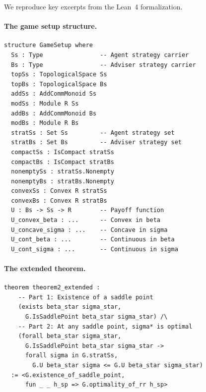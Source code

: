 \documentclass[11pt,a4paper]{article}
\theoremstyle{definition}
\begin{document}
We reproduce key excerpts from the Lean~4 formalization.

\paragraph{The game setup structure.}
\begin{lstlisting}[caption={The \texttt{GameSetup} structure axiomatizing the game (excerpt from \texttt{Theorem2Extension.lean}).},label={lst:gamesetup}]
structure GameSetup where
  Ss : Type                -- Agent strategy carrier
  Bs : Type                -- Adviser strategy carrier
  topSs : TopologicalSpace Ss
  topBs : TopologicalSpace Bs
  addSs : AddCommMonoid Ss
  modSs : Module R Ss
  addBs : AddCommMonoid Bs
  modBs : Module R Bs
  stratSs : Set Ss         -- Agent strategy set
  stratBs : Set Bs         -- Adviser strategy set
  compactSs : IsCompact stratSs
  compactBs : IsCompact stratBs
  nonemptySs : stratSs.Nonempty
  nonemptyBs : stratBs.Nonempty
  convexSs : Convex R stratSs
  convexBs : Convex R stratBs
  U : Bs -> Ss -> R        -- Payoff function
  U_convex_beta : ...      -- Convex in beta
  U_concave_sigma : ...    -- Concave in sigma
  U_cont_beta : ...        -- Continuous in beta
  U_cont_sigma : ...       -- Continuous in sigma
\end{lstlisting}

\paragraph{The extended theorem.}
\begin{lstlisting}[caption={The complete Extended Theorem~2 in Lean~4 (from \texttt{Theorem2Extension.lean}).},label={lst:theorem}]
theorem theorem2_extended :
    -- Part 1: Existence of a saddle point
    (exists beta_star sigma_star,
      G.IsSaddlePoint beta_star sigma_star) /\
    -- Part 2: At any saddle point, sigma* is optimal
    (forall beta_star sigma_star,
      G.IsSaddlePoint beta_star sigma_star ->
      forall sigma in G.stratSs,
        G.U beta_star sigma <= G.U beta_star sigma_star)
  := <G.existence_of_saddle_point,
      fun _ _ h_sp => G.optimality_of_rr h_sp>
\end{lstlisting}
\end{document}
